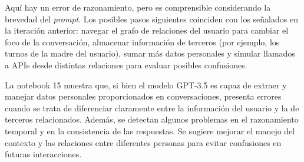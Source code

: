 Aquí hay un error de razonamiento, pero es comprensible considerando la brevedad del \textit{prompt}. Los posibles pasos siguientes coinciden con los señalados en la iteración anterior: navegar el grafo de relaciones del usuario para cambiar el foco de la conversación, almacenar información de terceros (por ejemplo, los turnos de la madre del usuario), sumar más datos personales y simular llamados a APIs desde distintas relaciones para evaluar posibles confusiones.

La notebook 15 muestra que, si bien el modelo GPT-3.5 es capaz de extraer y manejar datos personales proporcionados en conversaciones, presenta errores cuando se trata de diferenciar claramente entre la información del usuario y la de terceros relacionados. Además, se detectan algunos problemas en el razonamiento temporal y en la consistencia de las respuestas. Se sugiere mejorar el manejo del contexto y las relaciones entre diferentes personas para evitar confusiones en futuras interacciones. 